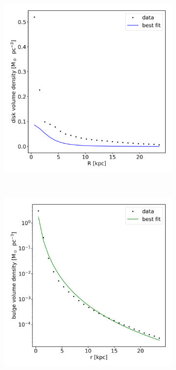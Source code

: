 \begin{figure}
    \begin{subfigure}[b]{0.3\textwidth}
        \includegraphics[width=\textwidth]{plots/Auriga/volume_dens_disk_fit_data.png}
	    \label{fig:disk_voldens_fit}
    \end{subfigure}
    ~ %
    \begin{subfigure}[b]{0.3\textwidth}
    \centering
    	\includegraphics[width=\textwidth]{plots/Auriga/volume_dens_bulge_fit_data.png}

\end{subfigure}
\end{figure}
